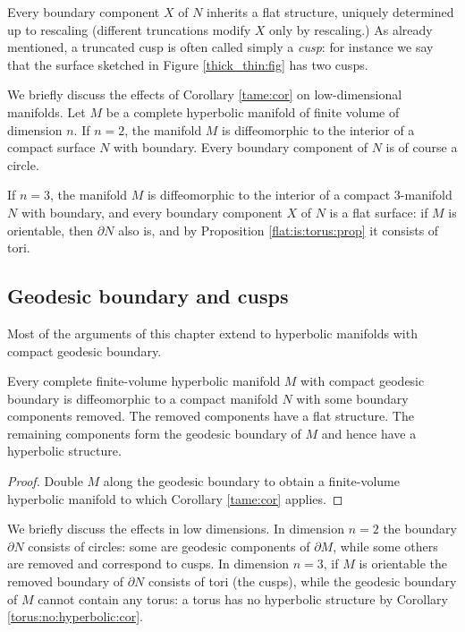 Every boundary component $X$ of $N$ inherits a flat structure, uniquely determined up to rescaling (different truncations modify $X$ only by rescaling.) As already mentioned, a truncated cusp is often called simply a \emph{cusp}: for instance we say that the surface sketched in Figure \ref{thick_thin:fig} has two cusps.

We briefly discuss the effects of Corollary \ref{tame:cor} on low-dimensional manifolds. 
Let $M$ be a complete hyperbolic manifold of finite volume of dimension $n$. If $n=2$, the manifold $M$ is diffeomorphic to the interior of a compact surface $N$ with boundary. Every boundary component of $N$ is of course a circle.

If $n=3$, the manifold $M$ is diffeomorphic to the interior of a compact 3-manifold $N$ with boundary, and every boundary component $X$ of $N$ is a flat surface: if $M$ is orientable, then $\partial N$ also is, and by Proposition \ref{flat:is:torus:prop} it consists of tori.

\subsection{Geodesic boundary and cusps}
Most of the arguments of this chapter extend to hyperbolic manifolds with compact geodesic boundary.

\begin{prop} \label{geodesic:M:N:prop}
Every complete finite-volume hyperbolic manifold $M$ with compact geodesic boundary is diffeomorphic to a compact manifold $N$ with some boundary components removed. The removed components have a flat structure. The remaining components form the geodesic boundary of $M$ and hence have a hyperbolic structure.
\end{prop}
\begin{proof}
Double $M$ along the geodesic boundary to obtain a finite-volume hyperbolic manifold to which Corollary \ref{tame:cor} applies. 
\end{proof}

We briefly discuss the effects in low dimensions. In dimension $n=2$ the boundary $\partial N$ consists of circles: some are geodesic components of $\partial M$, while some others are removed and correspond to cusps. In dimension $n=3$, if $M$ is orientable the removed boundary of $\partial N$ consists of tori (the cusps), while the geodesic boundary of $M$ cannot contain any torus: a torus has no hyperbolic structure by Corollary \ref{torus:no:hyperbolic:cor}.

